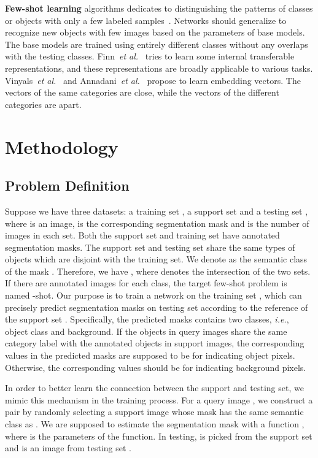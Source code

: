 \documentclass[journal]{IEEEtran}
\newcommand{\etal}{\emph{et al.}}
\newcommand{\ie}{\emph{i.e.}}
\begin{document}
\textbf{Few-shot learning} algorithms dedicates to distinguishing the patterns of classes or objects with only a few labeled samples~\cite{wu2019progressive,he2019asymptotic}. 
Networks should generalize to recognize new objects with few images based on the parameters of base models.
The base models are trained using entirely different classes without any overlaps with the testing classes.
Finn~\etal~\cite{finn2017model} tries to learn some internal transferable representations, and these representations are broadly applicable to various tasks.
Vinyals~\etal~\cite{vinyals2016matching} and Annadani~\etal~\cite{annadani2018preserving} propose to learn  embedding vectors. 
The vectors of the same categories are close, while the vectors of the different categories are apart.

	

\section{Methodology}
\subsection{Problem Definition}
Suppose we have three datasets: a training set , a support set  and a testing set , where  is an image,  is the corresponding segmentation mask and  is the number of images in each set.
Both the support set and training set have annotated segmentation masks.
The support set and testing set share the same types of objects which are disjoint with the training set.
We denote  as the semantic class of the mask . Therefore, we have , 
where  denotes the intersection of the two sets.
If there are  annotated images for each class, the target few-shot problem is named -shot.
Our purpose is to train a network on the training set , which can precisely predict segmentation masks  on testing set  according to the reference of the support set .
Specifically, the predicted masks contains two classes, \ie, object class and background. 
If the objects in query images share the same category label with the annotated objects in support images, the corresponding values in the predicted masks are supposed to be  for indicating object pixels. Otherwise, the corresponding values should be  for indicating background pixels.

In order to better learn the connection between the support and testing set, we mimic this mechanism in the training process.
For a query image , we construct a pair  by randomly selecting a support image  whose mask  has the same semantic class as .
We are supposed to estimate the segmentation mask  with a function , where  is the parameters of the function.
In testing,  is picked from the support set  and  is an image from testing set . 
\end{document}
